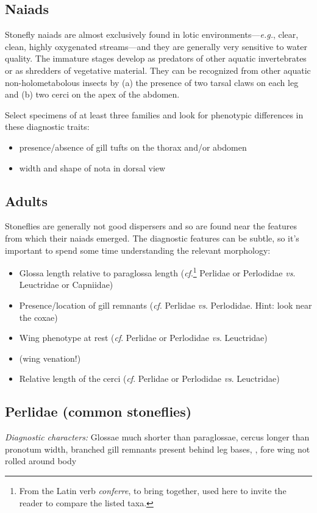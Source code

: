 \documentclass[letterpaper, 11pt]{article}
\begin{document}
\subsection*{Naiads}
Stonefly naiads are almost exclusively found in lotic environments---\textit{e.g.}, clear, clean, highly oxygenated streams---and they are generally very sensitive to water quality. The immature stages develop as predators of other aquatic invertebrates or as shredders of vegetative material. They can be recognized from other aquatic non-holometabolous insects by (a) the presence of two tarsal claws on each leg and (b) two cerci on the apex of the abdomen.

\noindent{}Select specimens of at least three families and look for phenotypic differences in these diagnostic traits:
\begin{itemize}
\item presence/absence of gill tufts on the thorax and/or abdomen
\item width and shape of nota in dorsal view
\end{itemize}

\subsection*{Adults}
Stoneflies are generally not good dispersers and so are found near the features from which their naiads emerged. The diagnostic features can be subtle, so it's important to spend some time understanding the relevant morphology:

\begin{itemize}
\item Glossa length relative to paraglossa length (\textit{cf}.\footnote{From the Latin verb \textit{conferre}, to bring together, used here to invite the reader to compare the listed taxa.} Perlidae or Perlodidae \textit{vs}. Leuctridae or Capniidae)
\item Presence/location of gill remnants (\textit{cf}. Perlidae \textit{vs}. Perlodidae. Hint: look near the coxae)
\item Wing phenotype at rest (\textit{cf}. Perlidae or Perlodidae \textit{vs}. Leuctridae)
\item (wing venation!)%
\item Relative length of the cerci (\textit{cf}. Perlidae or Perlodidae \textit{vs}. Leuctridae)
\end{itemize}

\subsection{Perlidae (common stoneflies)}
\noindent{}\textit{Diagnostic characters:} Glossae much shorter than paraglossae, cercus longer than pronotum width, branched gill remnants present behind leg bases, , fore wing not rolled around body
\end{document}
